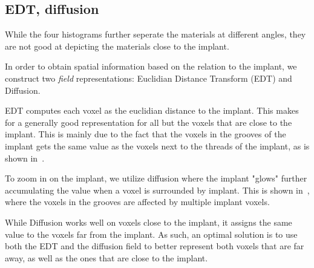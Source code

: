 \subsection{EDT, diffusion}
While the four histograms further seperate the materials at different angles, they are not good at depicting the materials close to the implant.

In order to obtain spatial information based on the relation to the implant, we construct two \emph{field} representations: Euclidian Distance Transform (EDT) and Diffusion.

EDT computes each voxel as the euclidian distance to the implant. This makes for a generally good representation for all but the voxels that are close to the implant. This is mainly due to the fact that the voxels in the grooves of the implant gets the same value as the voxels next to the threads of the implant, as is shown in~.

To zoom in on the implant, we utilize diffusion where the implant "glows" further accumulating the value when a voxel is surrounded by implant. This is shown in~, where the voxels in the grooves are affected by multiple implant voxels.


While Diffusion works well on voxels close to the implant, it assigns the same value to the voxels far from the implant. As such, an optimal solution is to use both the EDT and the diffusion field to better represent both voxels that are far away, as well as the ones that are close to the implant.

